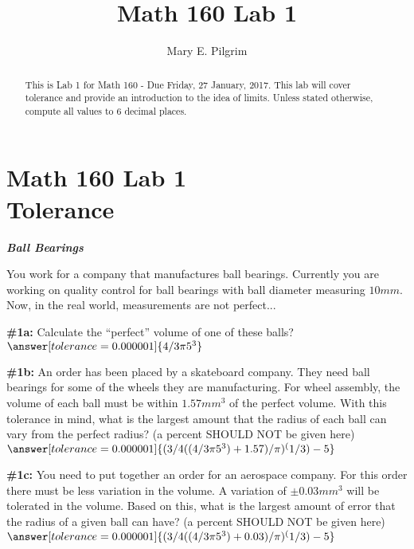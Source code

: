 \documentclass[handout,nooutcomes]{ximera}
\title{Math 160 Lab 1}
\author{Mary E. Pilgrim}
\begin{document}
\section{Math 160 Lab 1 \\ Tolerance}

\begin{abstract}
This is Lab 1 for Math 160 - Due Friday, 27 January, 2017. This lab will cover tolerance and provide an introduction to the idea of limits. Unless stated otherwise, compute all values to $6$ decimal places.
\end{abstract}

\maketitle

\begin{problem}{\textbf{\textit{Ball Bearings}}}

You work for a company that manufactures ball bearings. Currently you are working on quality control for ball bearings with ball diameter measuring $10mm$. Now, in the real world, measurements are not perfect...
    \begin{problem}{\textbf{\#1a:}}
    Calculate the ``perfect'' volume of one of these balls?
    $\answer[tolerance=0.000001]{4/3 \pi 5^3}$
    \end{problem}
    \begin{problem}{\textbf{\#1b:}}
    An order has been placed by a skateboard company. They need ball bearings for some of the wheels they are manufacturing. For wheel assembly, the volume of each ball must be within $1.57mm^3$ of the perfect volume. With this tolerance in mind, what is the largest amount that the radius of each ball can vary from the perfect radius? (a percent SHOULD NOT be given here)
    $\answer[tolerance=0.000001]{(3/4((4/3 \pi 5^3)+1.57)/\pi)^(1/3)-5}$
    \end{problem}
    \begin{problem}{\textbf{\#1c:}}
    You need to put together an order for an aerospace company. For this order there must be less variation in the volume. A variation of $\pm0.03mm^3$ will be tolerated in the volume. Based on this, what is the largest amount of error that the radius of a given ball can have? (a percent SHOULD NOT be given here)
    $\answer[tolerance=0.000001]{(3/4((4/3 \pi 5^3)+0.03)/\pi)^(1/3)-5}$    
    \end{problem}
\end{problem}
\end{document}
